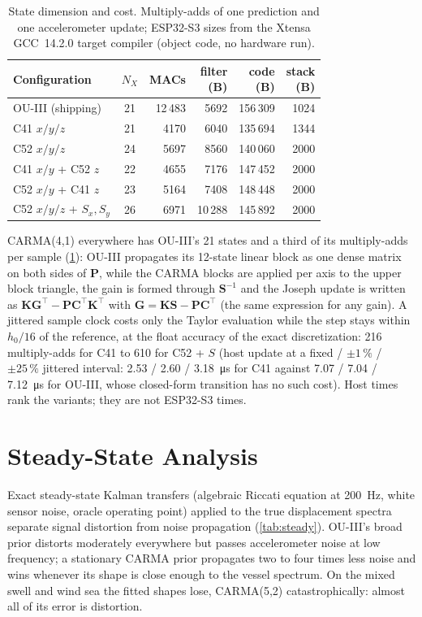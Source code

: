 \documentclass[conference]{IEEEtran}
\DeclareRobustCommand{\mat}[1]{\bm{#1}}
\theoremstyle{bodysmall}
\begin{document}
\begin{table}[t]
\centering
\caption{State dimension and cost. Multiply-adds of one prediction and one
accelerometer update; ESP32-S3 sizes from the Xtensa GCC~14.2.0 target
compiler (object code, no hardware run).}
\label{tab:cost}
\footnotesize
\setlength{\tabcolsep}{3pt}
\begin{tabular}{@{}lcrrrr@{}}
\toprule
Configuration & $N_X$ & MACs & \makecell{filter\\(B)} & \makecell{code\\(B)} & \makecell{stack\\(B)}\\
\midrule
OU-III (shipping) & 21 & 12\,483 & 5692 & 156\,309 & 1024\\
C41 $x/y/z$ & 21 & 4170 & 6040 & 135\,694 & 1344\\
C52 $x/y/z$ & 24 & 5697 & 8560 & 140\,060 & 2000\\
C41 $x/y$ + C52 $z$ & 22 & 4655 & 7176 & 147\,452 & 2000\\
C52 $x/y$ + C41 $z$ & 23 & 5164 & 7408 & 148\,448 & 2000\\
C52 $x/y/z$ + $S_x,S_y$ & 26 & 6971 & 10\,288 & 145\,892 & 2000\\
\bottomrule
\end{tabular}
\end{table}

CARMA(4,1) everywhere has OU-III's 21 states and a third of its
multiply-adds per sample (\cref{tab:cost}): OU-III propagates its 12-state
linear block as one dense matrix on both sides of $\mat{P}$, while the CARMA
blocks are applied per axis to the upper block triangle, the gain is formed
through $\mat{S}^{-1}$ and the Joseph update is written as
$\mat{K}\mat{G}^\top-\mat{P}\mat{C}^\top\mat{K}^\top$ with
$\mat{G}=\mat{K}\mat{S}-\mat{P}\mat{C}^\top$ (the same expression for any
gain). A jittered sample clock costs only the Taylor evaluation while the
step stays within $h_0/16$ of the reference, at the float accuracy of the
exact discretization: 216 multiply-adds for C41 to 610 for C52 + $S$
(host update at a fixed / $\pm1\,\%$ / $\pm25\,\%$
jittered interval: 2.53 / 2.60 / \SI{3.18}{\micro s} for C41 against 7.07 / 7.04 / \SI{7.12}{\micro s} for OU-III, whose
closed-form transition has no such cost). Host times rank the variants; they
are not ESP32-S3 times.

\section{Steady-State Analysis}
\label{sec:steady}
Exact steady-state Kalman transfers (algebraic Riccati equation at
\SI{200}{Hz}, white sensor noise, oracle operating point) applied to the true
displacement spectra separate signal distortion from noise propagation
(\cref{tab:steady}). OU-III's broad prior distorts moderately everywhere but
passes accelerometer noise at low frequency; a stationary CARMA prior
propagates two to four times less noise and wins whenever its shape is close
enough to the vessel spectrum. On the mixed swell and wind sea the fitted
shapes lose, CARMA(5,2) catastrophically: almost all of its error is
distortion.
\end{document}
